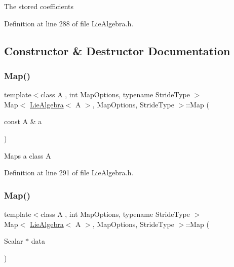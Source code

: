 The stored coefficients 

Definition at line 288 of file Lie\+Algebra.\+h.



\subsection{Constructor \& Destructor Documentation}
\hypertarget{class_map_3_01_lie_algebra_3_01_a_01_4_00_01_map_options_00_01_stride_type_01_4_a5e320dd14d4d47929d7a4d48014a735f}{}\label{class_map_3_01_lie_algebra_3_01_a_01_4_00_01_map_options_00_01_stride_type_01_4_a5e320dd14d4d47929d7a4d48014a735f} 
\subsubsection{\texorpdfstring{Map()}{Map()}\hspace{0.1cm}{\footnotesize\ttfamily [1/3]}}
{\footnotesize\ttfamily template$<$class A , int Map\+Options, typename Stride\+Type $>$ \\
Map$<$ \hyperlink{class_lie_algebra}{Lie\+Algebra}$<$ A $>$, Map\+Options, Stride\+Type $>$\+::Map (\begin{DoxyParamCaption}\item[{const A \&}]{a }\end{DoxyParamCaption})\hspace{0.3cm}{\ttfamily [inline]}}

Maps a class A 

Definition at line 291 of file Lie\+Algebra.\+h.

\hypertarget{class_map_3_01_lie_algebra_3_01_a_01_4_00_01_map_options_00_01_stride_type_01_4_a5b5a1ddc1058c048c2c202bf3bfd4763}{}\label{class_map_3_01_lie_algebra_3_01_a_01_4_00_01_map_options_00_01_stride_type_01_4_a5b5a1ddc1058c048c2c202bf3bfd4763} 
\subsubsection{\texorpdfstring{Map()}{Map()}\hspace{0.1cm}{\footnotesize\ttfamily [2/3]}}
{\footnotesize\ttfamily template$<$class A , int Map\+Options, typename Stride\+Type $>$ \\
Map$<$ \hyperlink{class_lie_algebra}{Lie\+Algebra}$<$ A $>$, Map\+Options, Stride\+Type $>$\+::Map (\begin{DoxyParamCaption}\item[{Scalar $\ast$}]{data }\end{DoxyParamCaption})\hspace{0.3cm}{\ttfamily [inline]}}

